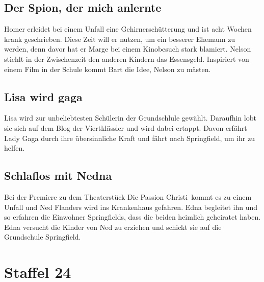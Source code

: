 \subsection{Der Spion, der mich anlernte}
Homer erleidet bei einem Unfall eine Gehirnerschütterung und ist acht Wochen krank geschrieben. Diese Zeit will er nutzen, um ein besserer Ehemann zu werden, denn davor hat er Marge bei einem Kinobesuch stark blamiert. Nelson stiehlt in der Zwischenzeit den anderen Kindern das Essensgeld. Inspiriert von einem Film in der Schule kommt Bart die Idee, Nelson zu mästen.



\subsection{Lisa wird gaga}\label{PABF14}
Lisa wird zur unbeliebtesten Schülerin der Grundschlule gewählt. Daraufhin lobt sie sich auf dem Blog der Viertklässler und wird dabei ertappt. Davon erfährt Lady Gaga durch ihre übersinnliche Kraft und fährt nach Springfield, um ihr zu helfen.

\subsection{Schlaflos mit Nedna}\label{PABF15}
Bei der Premiere zu dem Theaterstück \glqq Die Passion Christi\grqq\ kommt es zu einem Unfall und Ned Flanders wird ins Krankenhaus gefahren. Edna begleitet ihn und so erfahren die Einwohner Springfields, dass die beiden heimlich geheiratet haben. Edna versucht die Kinder von Ned zu erziehen und schickt sie auf die Grundschule Springfield. 



\section{Staffel 24}

